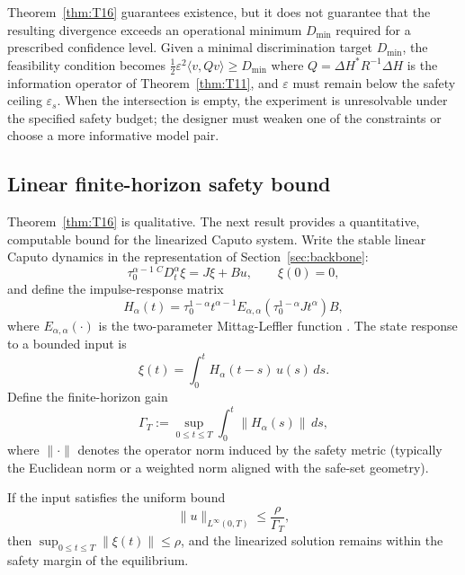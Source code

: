 \begin{remark}
Theorem~\ref{thm:T16} guarantees existence, but it does not guarantee that the resulting divergence exceeds an operational minimum \(D_{\min}\) required for a prescribed confidence level. Given a minimal discrimination target \(D_{\min}\), the feasibility condition becomes \(\tfrac{1}{2} \varepsilon^2 \langle v, Q v \rangle \ge D_{\min}\) where \(Q = \Delta H^{*} R^{-1} \Delta H\) is the information operator of Theorem~\ref{thm:T11}, and \(\varepsilon\) must remain below the safety ceiling \(\varepsilon_s\). When the intersection is empty, the experiment is unresolvable under the specified safety budget; the designer must weaken one of the constraints or choose a more informative model pair.
\end{remark}

\subsection{Linear finite-horizon safety bound}

Theorem~\ref{thm:T16} is qualitative. The next result provides a quantitative, computable bound for the linearized Caputo system. Write the stable linear Caputo dynamics in the representation of Section~\ref{sec:backbone}:
\begin{equation}
\tau_0^{\alpha-1}{\,}^C D_t^\alpha \xi = J \xi + B u,\qquad \xi(0) = 0,
\label{eq:linear_safety_system}
\end{equation}
and define the impulse-response matrix
\begin{equation}
H_\alpha(t) = \tau_0^{1-\alpha} t^{\alpha-1}
E_{\alpha, \alpha}\!\left(\tau_0^{1-\alpha} J t^\alpha\right) B,
\label{eq:impulse_Halpha}
\end{equation}
where \(E_{\alpha, \alpha}(\cdot)\) is the two-parameter Mittag-Leffler function \citep{gorenflo2020}. The state response to a bounded input is
\begin{equation}
\xi(t) = \int_0^t H_\alpha(t - s)\, u(s)\, ds.
\label{eq:state_conv}
\end{equation}
Define the finite-horizon gain
\begin{equation}
\Gamma_T := \sup_{0 \le t \le T} \int_0^t \|H_\alpha(s)\|\, ds,
\label{eq:GammaT}
\end{equation}
where \(\|\cdot\|\) denotes the operator norm induced by the safety metric (typically the Euclidean norm or a weighted norm aligned with the safe-set geometry).

\begin{lemma}
\label{lem:linear_safety}
If the input satisfies the uniform bound
\begin{equation}
\|u\|_{L^\infty(0, T)} \le \frac{\rho}{\Gamma_T},
\label{eq:safe_input_bound}
\end{equation}
then \(\sup_{0 \le t \le T} \|\xi(t)\| \le \rho\), and the linearized solution remains within the safety margin of the equilibrium.
\end{lemma}

